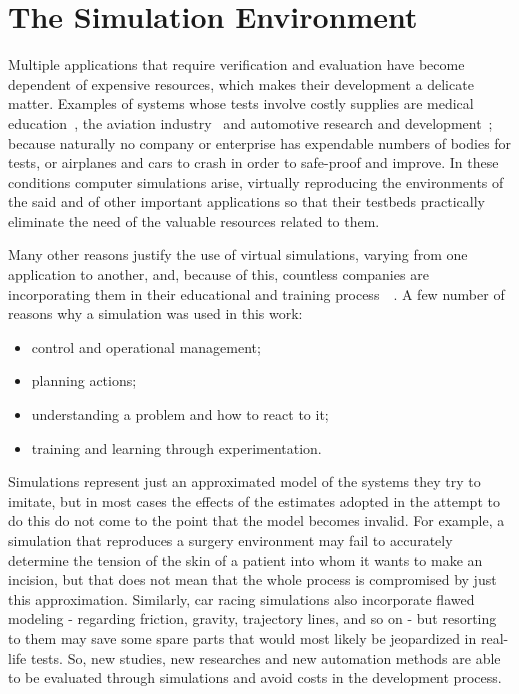 \section{\textbf{The Simulation Environment}} \label{sec:Environment}

	Multiple applications that require verification and evaluation have become dependent of expensive resources, which makes their development a delicate matter. Examples of systems whose tests involve costly supplies are medical education~\cite{MEDIC}, the aviation industry~\cite{AIR} and automotive research and development~\cite{AUTR}; because naturally no company or enterprise has expendable numbers of bodies for tests, or airplanes and cars to crash in order to safe-proof and improve. In these conditions computer simulations arise, virtually reproducing the environments of the said and of other important applications so that their testbeds practically eliminate the need of the valuable resources related to them.
	
	Many other reasons justify the use of virtual simulations, varying from one application to another, and, because of this, countless companies are incorporating them in their educational and training process~\cite{Simulation}~\cite{Operator}. A few number of reasons why a simulation was used in this work:
	
	\begin{itemize}
		
		\item control and operational management;
		
		\item planning actions;
		
		\item understanding a problem and how to react to it;
		
		\item training and learning through experimentation.
		
	\end{itemize}
	
	Simulations represent just an approximated model of the systems they try to imitate, but in most cases the effects of the estimates adopted in the attempt to do this do not come to the point that the model becomes invalid. For example, a simulation that reproduces a surgery environment may fail to accurately determine the tension of the skin of a patient into whom it wants to make an incision, but that does not mean that the whole process is compromised by just this approximation. Similarly, car racing simulations also incorporate flawed modeling - regarding friction, gravity, trajectory lines, and so on - but resorting to them may save some spare parts that would most likely be jeopardized in real-life tests. So, new studies, new researches and new automation methods are able to be evaluated through simulations and avoid costs in the development process.
	
